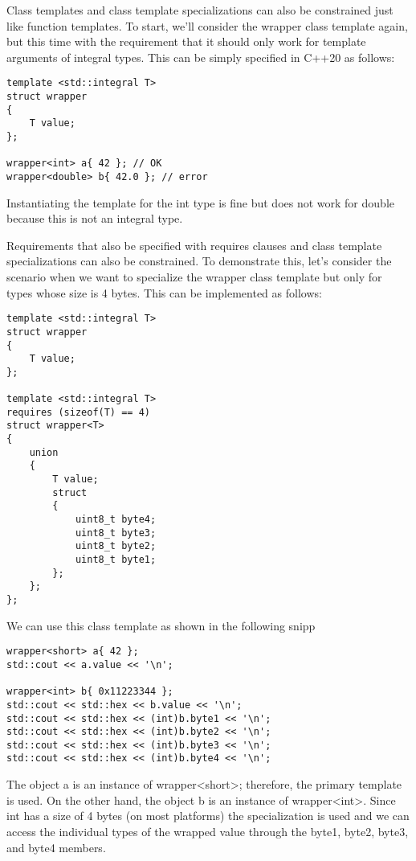 Class templates and class template specializations can also be constrained just like function templates. To start, we’ll consider the wrapper class template again, but this time with the requirement that it should only work for template arguments of integral types. This can be simply specified in C++20 as follows:

\begin{lstlisting}[style=styleCXX]
template <std::integral T>
struct wrapper
{
	T value;
};

wrapper<int> a{ 42 }; // OK
wrapper<double> b{ 42.0 }; // error
\end{lstlisting}

Instantiating the template for the int type is fine but does not work for double because this is not an integral type.

Requirements that also be specified with requires clauses and class template specializations can also be constrained. To demonstrate this, let’s consider the scenario when we want to specialize the wrapper class template but only for types whose size is 4 bytes. This can be implemented as follows:

\begin{lstlisting}[style=styleCXX]
template <std::integral T>
struct wrapper
{
	T value;
};

template <std::integral T>
requires (sizeof(T) == 4)
struct wrapper<T>
{
	union
	{
		T value;
		struct
		{
			uint8_t byte4;
			uint8_t byte3;
			uint8_t byte2;
			uint8_t byte1;
		};
	};
};
\end{lstlisting}

We can use this class template as shown in the following snipp

\begin{lstlisting}[style=styleCXX]
wrapper<short> a{ 42 };
std::cout << a.value << '\n';

wrapper<int> b{ 0x11223344 };
std::cout << std::hex << b.value << '\n';
std::cout << std::hex << (int)b.byte1 << '\n';
std::cout << std::hex << (int)b.byte2 << '\n';
std::cout << std::hex << (int)b.byte3 << '\n';
std::cout << std::hex << (int)b.byte4 << '\n';
\end{lstlisting}

The object a is an instance of wrapper<short>; therefore, the primary template is used. On the other hand, the object b is an instance of wrapper<int>. Since int has a size of 4 bytes (on most platforms) the specialization is used and we can access the individual types of the wrapped value through the byte1, byte2, byte3, and byte4 members.


